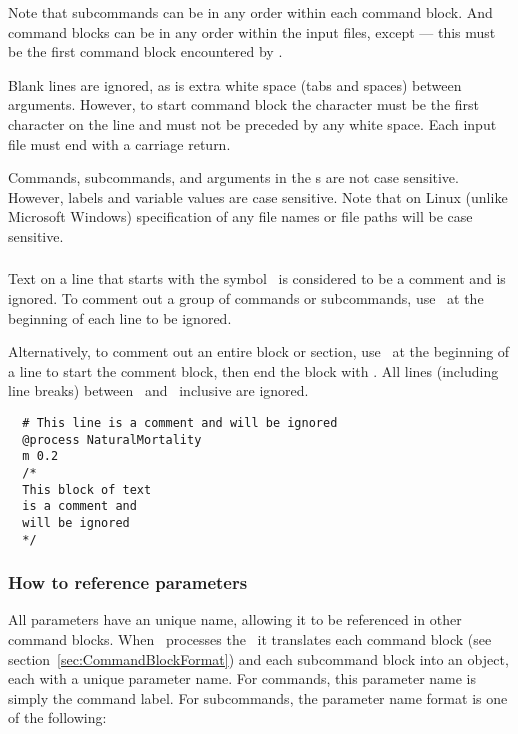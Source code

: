 Note that subcommands can be in any order within each command block. And command blocks can be in any order within the input files, except  --- this must be the first command block encountered by \CNAME.

Blank lines are ignored, as is extra white space (tabs and spaces) between arguments. However, to start command block the \command{} character must be the first character on the line and must not be preceded by any white space. Each input file must end with a carriage return.

Commands, subcommands, and arguments in the \config s are not case sensitive. However, labels and variable values are case sensitive. Note that on Linux (unlike Microsoft Windows) specification of any file names or file paths will be case sensitive.

\subsubsection{}

Text on a line that starts with the symbol \commentline\ is considered to be a comment and is ignored. To comment out a group of commands or subcommands, use \commentline\ at the beginning of each line to be ignored.

Alternatively, to comment out an entire block or section, use \commentstart\ at the beginning of a line to start the comment block, then end the block with \commentend. All lines (including line breaks) between \commentstart\ and \commentend\ inclusive are ignored.

\small{\begin{verbatim}
  # This line is a comment and will be ignored
  @process NaturalMortality
  m 0.2
  /* 
  This block of text
  is a comment and
  will be ignored
  */
\end{verbatim}}

\subsubsection{How to reference parameters\label{sec:parameter-names}}

All parameters have an unique name, allowing it to be referenced in other command blocks. When \CNAME\ processes the \config\ it translates each command block (see section~\ref{sec:CommandBlockFormat}) and each subcommand block into an object, each with a unique parameter name. For commands, this parameter name is simply the command label. For subcommands, the parameter name format is one of the following:


